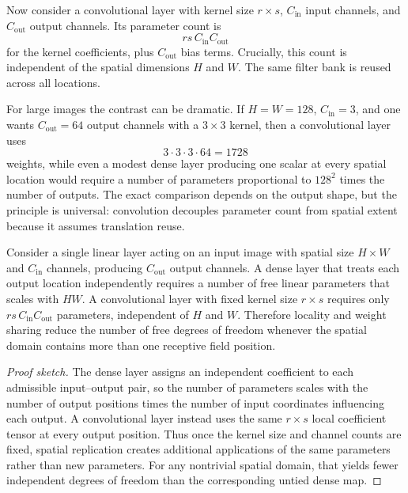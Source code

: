 Now consider a convolutional layer with kernel size $r \times s$, $C_{\mathrm{in}}$ input channels, and $C_{\mathrm{out}}$ output channels.
Its parameter count is
\[
 r s\, C_{\mathrm{in}} C_{\mathrm{out}}
\]
for the kernel coefficients, plus $C_{\mathrm{out}}$ bias terms.
Crucially, this count is independent of the spatial dimensions $H$ and $W$.
The same filter bank is reused across all locations.

\medskip

For large images the contrast can be dramatic.
If $H=W=128$, $C_{\mathrm{in}}=3$, and one wants $C_{\mathrm{out}}=64$ output channels with a $3\times 3$ kernel, then a convolutional layer uses
\[
3\cdot 3\cdot 3\cdot 64 = 1728
\]
weights, while even a modest dense layer producing one scalar at every spatial location would require a number of parameters proportional to $128^2$ times the number of outputs.
The exact comparison depends on the output shape, but the principle is universal:
convolution decouples parameter count from spatial extent because it assumes translation reuse.

\begin{proposition}
Consider a single linear layer acting on an input image with spatial size $H \times W$ and $C_{\mathrm{in}}$ channels, producing $C_{\mathrm{out}}$ output channels.
A dense layer that treats each output location independently requires a number of free linear parameters that scales with $HW$.
A convolutional layer with fixed kernel size $r \times s$ requires only $rs\, C_{\mathrm{in}} C_{\mathrm{out}}$ parameters, independent of $H$ and $W$.
Therefore locality and weight sharing reduce the number of free degrees of freedom whenever the spatial domain contains more than one receptive field position.
\end{proposition}

\begin{proof}[Proof sketch]
The dense layer assigns an independent coefficient to each admissible input--output pair, so the number of parameters scales with the number of output positions times the number of input coordinates influencing each output.
A convolutional layer instead uses the same $r \times s$ local coefficient tensor at every output position.
Thus once the kernel size and channel counts are fixed, spatial replication creates additional applications of the same parameters rather than new parameters.
For any nontrivial spatial domain, that yields fewer independent degrees of freedom than the corresponding untied dense map.
\end{proof}

